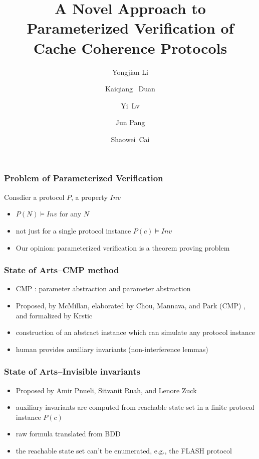 \documentclass{beamer}
\begin{document}


\title{ A Novel Approach to Parameterized Verification of Cache Coherence Protocols}

\author{Yongjian Li \and  Kaiqiang~ Duan \and Yi~Lv \and Jun Pang \and Shaowei~Cai}


\frame{\titlepage}

\begin{frame}\frametitle{Problem of Parameterized Verification}
Consdier a protocol $P$, a property $Inv$
\begin{itemize}
\item  $P(N) \models Inv$ for any $N$
\item not just for a single protocol instance  $P(c)\models Inv$
\item Our opinion: parameterized verification is a theorem proving problem
\end{itemize}
\end{frame}

\begin{frame}\frametitle{State of Arts--CMP method}
\begin{itemize}
\item CMP :  parameter abstraction and parameter abstraction
\item Proposed, by McMillan, elaborated by Chou, Mannava, and Park (CMP) , and formalized
by Krstic
\item construction of an abstract instance which can simulate any protocol instance
\item human provides auxiliary invariants (non-interference lemmas)
\end{itemize}
\end{frame}


\begin{frame}\frametitle{State of Arts--Invisible invariants }
\begin{itemize}
\item  Proposed by Amir Pnueli, Sitvanit Ruah, and Lenore Zuck
\item  auxiliary invariants are computed from reachable state set in a finite protocol
instance $P(c)$
\item raw formula translated from BDD
\item  the reachable state set can't be enumerated, e.g., the FLASH protocol
\end{itemize}
\end{frame}
\end{document}
